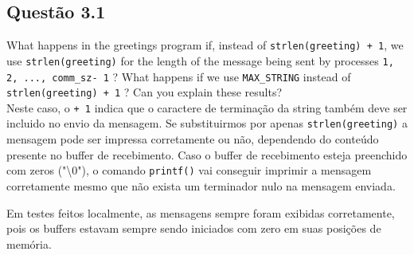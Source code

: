 
\subsection{Questão 3.1}

What happens in the greetings program if, instead of \texttt{strlen(greeting) + 1}, we use \texttt{strlen(greeting)} for the length of the message being sent by processes \texttt{1, 2, ..., comm\_sz- 1} ? What happens if we use \texttt{MAX\_STRING} instead of \texttt{strlen(greeting) + 1} ? Can you explain these results?\\

Neste caso, o \texttt{+ 1} indica que o caractere de terminação da string também deve ser incluido no envio da mensagem. Se substituirmos por apenas \texttt{strlen(greeting)} a mensagem pode ser impressa corretamente ou não, dependendo do conteúdo presente no buffer de recebimento. Caso o buffer de recebimento esteja preenchido com zeros ("\textbackslash0"), o comando \texttt{printf()} vai conseguir imprimir a mensagem corretamente mesmo que não exista um terminador nulo na mensagem enviada.

Em testes feitos localmente, as mensagens sempre foram exibidas corretamente, pois os buffers estavam sempre sendo iniciados com zero em suas posições de memória.

